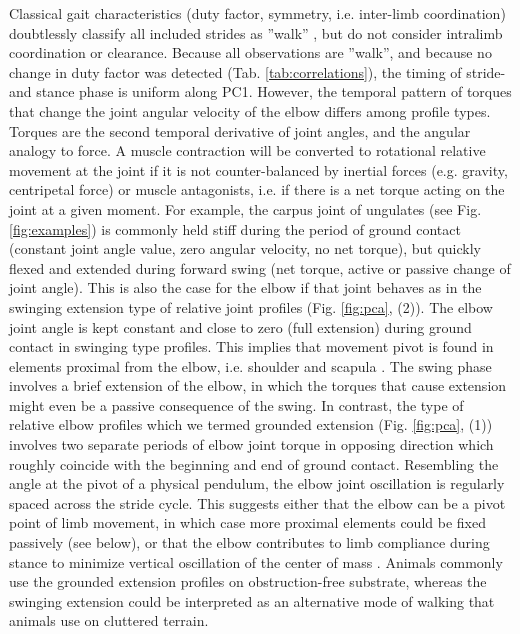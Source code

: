 \documentclass[10pt, a4paper]{article}
\begin{document}
\begin{linenumbers}[1]
Classical gait characteristics (duty factor, symmetry, i.e. inter-limb coordination) doubtlessly classify all included strides as ''walk'' \citep{Hildebrand1989}, but do not consider intralimb coordination or clearance. 
Because all observations are ''walk'', and because no change in duty factor was detected (Tab. \ref{tab:correlations}), the timing of stride- and stance phase is uniform along PC1. 
However, the temporal pattern of torques that change the joint angular velocity of the elbow differs among profile types. 
Torques are the second temporal derivative of joint angles, and the angular analogy to force. 
A muscle contraction will be converted to rotational relative movement at the joint if it is not counter-balanced by inertial forces (e.g. gravity, centripetal force) or muscle antagonists, i.e. if there is a net torque acting on the joint at a given moment. 
For example, the carpus joint of ungulates (see Fig. \ref{fig:examples}) is commonly held stiff during the period of ground contact (constant joint angle value, zero angular velocity, no net torque), but quickly flexed and extended during forward swing (net torque, active or passive change of joint angle).
This is also the case for the elbow if that joint behaves as in the swinging extension type of relative joint profiles (Fig. \ref{fig:pca}, (2)). 
The elbow joint angle is kept constant and close to zero (full extension) during ground contact in swinging type profiles. 
This implies that movement pivot is found in elements proximal from the elbow, i.e. shoulder and scapula \citep[][]{Fischer2002}. 
The swing phase involves a brief extension of the elbow, in which the torques that cause extension might even be a passive consequence of the swing. 
In contrast, the type of relative elbow profiles which we termed grounded extension (Fig. \ref{fig:pca}, (1)) involves two separate periods of elbow joint torque in opposing direction which roughly coincide with the beginning and end of ground contact. 
Resembling the angle at the pivot of a physical pendulum, the elbow joint oscillation is regularly spaced across the stride cycle. 
This suggests either that the elbow can be a pivot point of limb movement, in which case more proximal elements could be fixed passively (see below), or that the elbow contributes to limb compliance during stance to minimize vertical oscillation of the center of mass \citep[\textit{cf.}][]{Geyer2006}. 
Animals commonly use the grounded extension profiles on obstruction-free substrate, whereas the swinging extension could be interpreted as an alternative mode of walking that animals use on cluttered terrain. 

\end{linenumbers}
\end{document}
